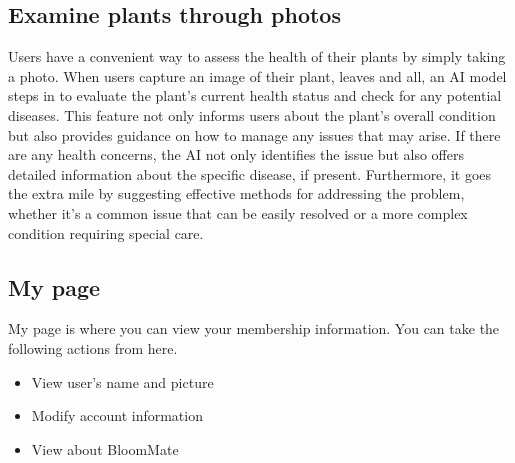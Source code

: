 \documentclass[conference, a4paper]{IEEEtran}
\begin{document}
\subsection{Examine plants through photos}
Users have a convenient way to assess the health of their plants by simply taking a photo. When users capture an image of their plant, leaves and all, an AI model steps in to evaluate the plant's current health status and check for any potential diseases. This feature not only informs users about the plant's overall condition but also provides guidance on how to manage any issues that may arise. If there are any health concerns, the AI not only identifies the issue but also offers detailed information about the specific disease, if present. Furthermore, it goes the extra mile by suggesting effective methods for addressing the problem, whether it's a common issue that can be easily resolved or a more complex condition requiring special care. \\ 

\subsection{My page}
My page is where you can view your membership information. You can take the following actions from here.
\begin{itemize}
    \item View user's name and picture
    \item Modify account information
    \item View about BloomMate
\end{itemize}



\end{document}
